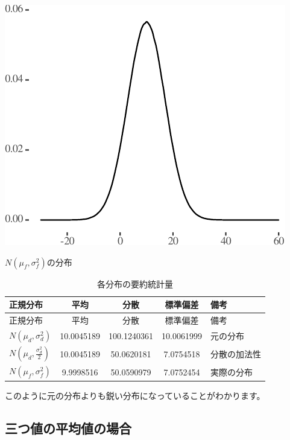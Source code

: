 \documentclass[a4paper]{tufte-handout}
\begin{document}
\begin{marginfigure}

{\centering \includegraphics{AdditivityOfVariance_files/figure-latex/unnamed-chunk-12-1} 

}

\caption[$N(\mu_f, \sigma^2_f)$の分布]{$N(\mu_f, \sigma^2_f)$の分布}\label{fig:unnamed-chunk-12}
\end{marginfigure}

\begin{longtable}[]{@{}lcccl@{}}
\caption{各分布の要約統計量}\tabularnewline
\toprule
正規分布 & 平均 & 分散 & 標準偏差 & 備考 \\
\midrule
\endfirsthead
\toprule
正規分布 & 平均 & 分散 & 標準偏差 & 備考 \\
\midrule
\endhead
\(N(\mu_d, \sigma^2_d)\) & 10.0045189 & 100.1240361 & 10.0061999 &
元の分布 \\
\(N(\mu_d, \frac{\sigma^2_d}{2})\) & 10.0045189 & 50.0620181 & 7.0754518
& 分散の加法性 \\
\(N(\mu_f, \sigma^2_f)\) & 9.9998516 & 50.0590979 & 7.0752454 &
実際の分布 \\
\bottomrule
\end{longtable}

このように元の分布よりも鋭い分布になっていることがわかります。

\newpage

\hypertarget{ux4e09ux3064ux5024ux306eux5e73ux5747ux5024ux306eux5834ux5408}{%
\subsection{\texorpdfstring{\textbf{三つ値の平均値の場合}}{三つ値の平均値の場合}}\label{ux4e09ux3064ux5024ux306eux5e73ux5747ux5024ux306eux5834ux5408}}
\end{document}
